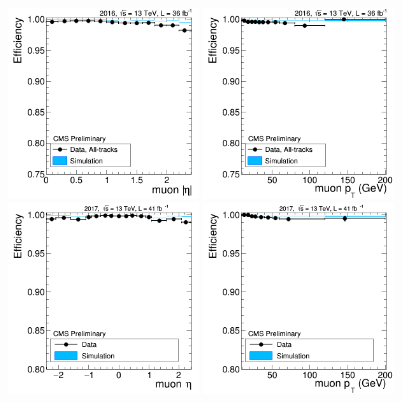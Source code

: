 \begin{figure}[!htpb]
  \centering
  \captionsetup{width=0.98\textwidth,justification=centering}
  \includegraphics[width=0.45\textwidth]{plots/chapter5/TrackEta2016.png}
  \includegraphics[width=0.45\textwidth]{plots/chapter5/TrackPt2016.png} \\
  \includegraphics[width=0.45\textwidth]{plots/chapter5/TrackEta2017.png}
  \includegraphics[width=0.45\textwidth]{plots/chapter5/TrackPt2017.png} \\

\end{figure}
